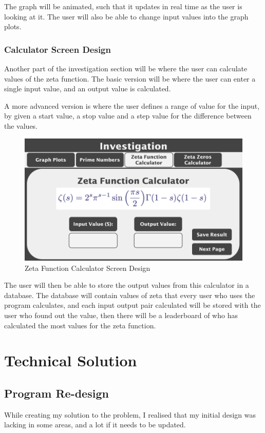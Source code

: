 \documentclass{article}
\begin{document}
The graph will be animated, such that it updates in real time as the user is looking at it. The user will also be able to change input values into the graph plots.

\subsubsection{Calculator Screen Design}

Another part of the investigation section will be where the user can calculate values of the zeta function. The basic version will be where the user can enter a single input value, and an output value is calculated.

A more advanced version is where the user defines a range of value for the input, by given a start value, a stop value and a step value for the difference between the values.

\begin{figure}[h]
    \centering
    \includegraphics[scale=0.18]{zeta-function-calculator-screen-design}
    \caption{Zeta Function Calculator Screen Design}
\end{figure}

The user will then be able to store the output values from this calculator in a database. The database will contain values of zeta that every user who uses the program calculates, and each input output pair calculated will be stored with the user who found out the value, then there will be a leaderboard of who has calculated the most values for the zeta function.


\clearpage
\section{Technical Solution}

\subsection{Program Re-design}
While creating my solution to the problem, I realised that my initial design was lacking in some areas, and a lot if it needs to be updated.
\end{document}
